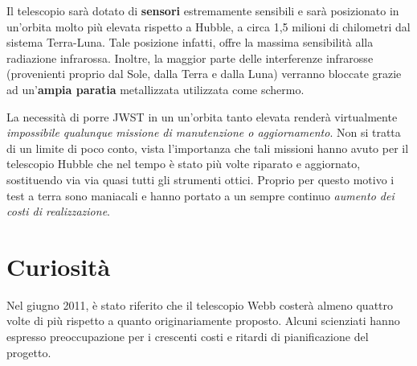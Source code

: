 \documentclass[12pt,a4paper]{article}
\begin{document}
Il telescopio sarà dotato di \textbf{sensori} estremamente sensibili e sarà posizionato in un'orbita molto più elevata rispetto a Hubble, a circa 1,5 milioni di chilometri dal sistema Terra-Luna. Tale posizione infatti, offre la massima sensibilità alla radiazione infrarossa. Inoltre, la maggior parte delle interferenze infrarosse (provenienti proprio dal Sole, dalla Terra e dalla Luna) verranno bloccate grazie ad un'\textbf{ampia paratia} metallizzata utilizzata come schermo.

La necessità di porre JWST in un un'orbita tanto elevata renderà virtualmente \emph{impossibile qualunque missione di manutenzione o aggiornamento}. Non si tratta di un limite di poco conto, vista l'importanza che tali missioni hanno avuto per il telescopio Hubble che nel tempo è stato più volte riparato e aggiornato, sostituendo via via quasi tutti gli strumenti ottici. Proprio per questo motivo i test a terra sono maniacali e hanno portato a un sempre continuo \emph{aumento dei costi di realizzazione}.

\section*{Curiosità}
\label{curiosit}

Nel giugno 2011, è stato riferito che il telescopio Webb costerà almeno quattro volte di più rispetto a quanto originariamente proposto.
Alcuni scienziati hanno espresso preoccupazione per i crescenti costi e ritardi di pianificazione del progetto.
\end{document}
